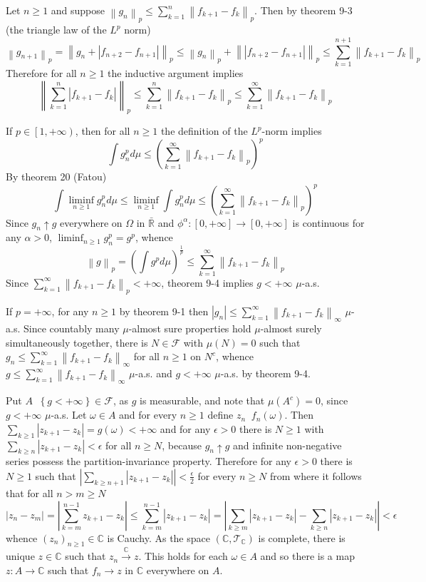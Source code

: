\documentclass[a4paper]{article}
\newcommand{\obj}[1]{\left\{ #1 \right \}}
\newcommand{\clo}[1]{\left [ #1 \right ]}
\newcommand{\clop}[1]{\left [ #1 \right )}
\newcommand{\brac}[1]{\left ( #1 \right )}
\newcommand{\abs}[1]{\left | #1 \right |}
\newcommand{\nrm}[1]{\left\| #1 \right \|}
\newcommand{\Rbar}{{\bar{\mathbb{R}}}}
\newcommand{\Zinf}{\clo{ 0, +\infty }}
\newcommand{\Cplx}{\mathbb{C}}
\newcommand{\Tcal}{\mathcal{T}}
\newcommand{\Fcal}{\mathcal{F}}
\newcommand{\defn}{\mathop{\overset{\Delta}{=}}\nolimits}
\begin{document}
Let $n\geq 1$ and suppose $\nrm{g_n}_p \leq \sum_{k=1}^n \nrm{f_{k+1}-f_k}_p$. Then by theorem 9-3 (the triangle law of the $L^p$ norm) \[\nrm{g_{n+1}}_p = \nrm{ g_n + \abs{f_{n+2}-f_{n+1}} }_p \leq \nrm{g_n}_p + \nrm{\abs{f_{n+2}-f_{n+1}} }_p \leq \sum_{k=1}^{n+1} \nrm{f_{k+1}-f_k}_p\] Therefore for all $n\geq 1$ the inductive argument implies \[\nrm{ \sum_{k=1}^n \abs{f_{k+1}-f_k} }_p\leq \sum_{k=1}^n \nrm{f_{k+1}-f_k}_p\leq \sum_{k=1}^\infty \nrm{f_{k+1}-f_k}_p\]

If $p\in \clop{1,+\infty}$, then for all $n\geq 1$ the definition of the $L^p$-norm implies \[ \int g_n^p d\mu \leq \brac{\sum_{k=1}^\infty \nrm{f_{k+1}-f_k}_p}^p \] By theorem 20 (Fatou) \[\int \liminf_{n\geq 1} g_n^p d\mu \leq \liminf_{n\geq 1} \int g_n^p d\mu \leq \brac{\sum_{k=1}^\infty \nrm{f_{k+1}-f_k}_p}^p\] Since $g_n\uparrow g$ everywhere on $\Omega$ in $\Rbar$ and $\phi^\alpha:\Zinf\to \Zinf$ is continuous for any $\alpha>0$, $\liminf_{n\geq 1} g_n^p = g^p$, whence \[\nrm{g}_p = \brac{\int g^p d\mu}^\frac{1}{p} \leq \sum_{k=1}^\infty \nrm{f_{k+1}-f_k}_p\] Since $\sum_{k=1}^\infty \nrm{f_{k+1}-f_k}_p < +\infty$, theorem 9-4 implies $g<+\infty$ $\mu$-a.s.

If $p=+\infty$, for any $n\geq 1$ by theorem 9-1 then $\abs{g_n}\leq \sum_{k=1}^\infty \nrm{f_{k+1}-f_k}_\infty$ $\mu$-a.s. Since countably many $\mu$-almost sure properties hold $\mu$-almost surely simultaneously together, there is $N\in \Fcal$ with $\mu\brac{N}=0$ such that $g_n\leq \sum_{k=1}^\infty \nrm{f_{k+1}-f_k}_\infty$ for all $n\geq 1$ on $N^c$, whence $g\leq \sum_{k=1}^\infty \nrm{f_{k+1}-f_k}_\infty$ $\mu$-a.s. and $g<+\infty$ $\mu$-a.s. by theorem 9-4.

Put $A\defn \obj{g < +\infty}\in \Fcal$, as $g$ is measurable, and note that $\mu\brac{A^c}=0$, since $g<+\infty$ $\mu$-a.s. Let $\omega\in A$ and for every $n\geq 1$ define $z_n\defn f_n\brac{\omega}$. Then $\sum_{k\geq 1} \abs{z_{k+1}-z_k} = g\brac{\omega} < +\infty$ and for any $\epsilon>0$ there is $N\geq 1$ with $\sum_{k\geq n} \abs{z_{k+1}-z_k}<\epsilon$ for all $n\geq N$, because $g_n\uparrow g$ and infinite non-negative series possess the partition-invariance property. Therefore for any $\epsilon>0$ there is $N\geq 1$ such that $\abs{\sum_{k\geq n+1} \abs{z_{k+1}-z_k}} < \frac{\epsilon}{2}$ for every $n\geq N$ from where it follows that for all $n > m\geq N$ \[\abs{z_n-z_m} = \abs{ \sum_{k=m}^{n-1} z_{k+1}-z_k } \leq \sum_{k=m}^{n-1} \abs{z_{k+1}-z_k} = \abs{ \sum_{k\geq m} \abs{z_{k+1}-z_k} - \sum_{k\geq n} \abs{z_{k+1}-z_k} } < \epsilon\] whence $\brac{z_n}_{n\geq 1}\in \Cplx$ is Cauchy. As the space $\brac{\Cplx, \Tcal_\Cplx}$ is complete, there is unique $z\in \Cplx$ such that $z_n\overset{\Cplx}{\to} z$. This holds for each $\omega\in A$ and so there is a map $z:A\to \Cplx$ such that $f_n\to z$ in $\Cplx$ everywhere on $A$.
\end{document}
